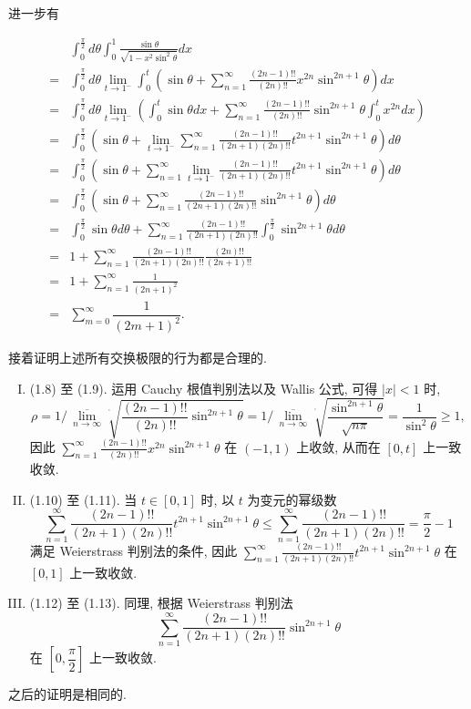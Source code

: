 \documentclass[11pt,a4paper,openany,oneside]{book}
\begin{document}
进一步有

\begin{align}
&\int_{0}^{\frac{\pi}{2}}d\theta\int_{0}^{1}\frac{\sin\theta }{\sqrt{1-x^2 \sin ^2\theta }}dx\\
=&\int_{0}^{\frac{\pi}{2}}d\theta\lim_{t\to 1^-}\int_{0}^{t}\left(\sin\theta+\sum_{n=1}^{\infty}\frac{(2n-1)!!}{(2n)!!}x^{2n} \sin ^{2n+1}\theta\right)dx\\
=&\int_{0}^{\frac{\pi}{2}}d\theta\lim_{t\to 1^-}\left(\int_{0}^{t}\sin\theta dx+\sum_{n=1}^{\infty}\frac{(2n-1)!!}{(2n)!!}\sin ^{2n+1}\theta\int_{0}^{t}x^{2n}dx \right)\\
=&\int_{0}^{\frac{\pi}{2}}\left(\sin\theta+\lim_{t\to 1^-}\sum_{n=1}^{\infty}\frac{(2n-1)!!}{(2n+1)(2n)!!}t^{2n+1} \sin ^{2n+1}\theta\right)d\theta\\
=&\int_{0}^{\frac{\pi}{2}}\left(\sin\theta+\sum_{n=1}^{\infty}\lim_{t\to 1^-}\frac{(2n-1)!!}{(2n+1)(2n)!!}t^{2n+1} \sin ^{2n+1}\theta\right)d\theta\\
=&\int_{0}^{\frac{\pi}{2}}\left(\sin\theta+\sum_{n=1}^{\infty}\frac{(2n-1)!!}{(2n+1)(2n)!!}\sin ^{2n+1}\theta\right)d\theta\\
=&\int_{0}^{\frac{\pi}{2}}\sin\theta d\theta+\sum_{n=1}^{\infty}\frac{(2n-1)!!}{(2n+1)(2n)!!} \int_{0}^{\frac{\pi}{2}}\sin ^{2n+1}\theta d\theta\\
=&1+\sum_{n=1}^{\infty}\frac{(2n-1)!!}{(2n+1)(2n)!!} \frac{(2n)!!}{(2n+1)!!}\\
=&1+\sum_{n=1}^{\infty}\frac{1}{(2n+1)^2}\\
=&\sum\limits_{m=0}^{\infty}\dfrac{1}{(2m+1)^2}.
\end{align}

接着证明上述所有交换极限的行为都是合理的.

\begin{enumerate}[I.]
\item (1.8) 至 (1.9). 运用 Cauchy 根值判别法以及 Wallis 公式, 可得 $|x|<1$ 时,
\[
\rho=1\Bigg/\,\overline{\lim\limits_{n\to\infty}}\sqrt[^{^{^n}}]{\frac{(2n-1)!!}{(2n)!!} \sin ^{2n+1}\theta}=1\Bigg/\,\overline{\lim\limits_{n\to\infty}}\sqrt[^{^{^n}}]{\frac{\sin^{2n+1}\theta}{\sqrt{n\pi}}}=\frac{1}{\sin^{2}\theta}\ge1,
\] 
因此 $\sum\limits_{n=1}^{\infty}\frac{(2n-1)!!}{(2n)!!}x^{2n} \sin ^{2n+1}\theta$ 在 $(-1,1)$ 上收敛, 从而在 $[0,t]$ 上一致收敛.

\item (1.10) 至 (1.11). 当 $t\in[0,1]$ 时, 以 $t$ 为变元的幂级数
\[
\sum_{n=1}^{\infty}\frac{(2n-1)!!}{(2n+1)(2n)!!}t^{2n+1}\sin^{2n+1}\theta\le\sum_{n=1}^{\infty}\frac{(2n-1)!!}{(2n+1)(2n)!!}=\frac{\pi}{2}-1
\]
满足 Weierstrass 判别法的条件, 因此 $\sum\limits_{n=1}^{\infty}\frac{(2n-1)!!}{(2n+1)(2n)!!}t^{2n+1}\sin^{2n+1}\theta$ 在 $[0,1]$ 上一致收敛.

\item (1.12) 至 (1.13). 同理, 根据 Weierstrass 判别法
\[
\sum_{n=1}^{\infty}\frac{(2n-1)!!}{(2n+1)(2n)!!}\sin ^{2n+1}\theta
\]
在 $\left[0,\dfrac{\pi}{2}\right]$ 上一致收敛. 
\end{enumerate}

之后的证明是相同的.
\end{document}
